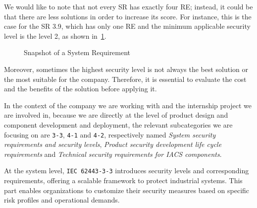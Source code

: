 We would like to note that not every SR has exactly four RE; instead, it could be that there are less solutions in order to increase its score. For instance, this is the case for the SR 3.9, which has only one RE and the minimum applicable security level is the level 2, as shown in~\cref{fig:iec62443_3-3_3_9}.

\begin{figure}[t]
  \centering
  \caption[Snapshot of a System Requirement]{Snapshot of a System Requirement}
  \label{fig:iec62443_3-3_3_9}
\end{figure}

Moreover, sometimes the highest security level is not always the best solution or the most suitable for the company. Therefore, it is essential to evaluate the cost and the benefits of the solution before applying it.


In the context of the company we are working with and the internship project we are involved in, because we are directly at the level of product design and component development and deployment, the relevant subcategories we are focusing on are \texttt{3-3}, \texttt{4-1} and \texttt{4-2}, respectively named \textit{System security requirements and security levels}, \textit{Product security development life cycle requirements} and \textit{Technical security requirements for IACS components}.

At the system level, \texttt{IEC 62443-3-3} introduces security levels and corresponding requirements, offering a scalable framework to protect industrial systems. This part enables organizations to customize their security measures based on specific risk profiles and operational demands.

